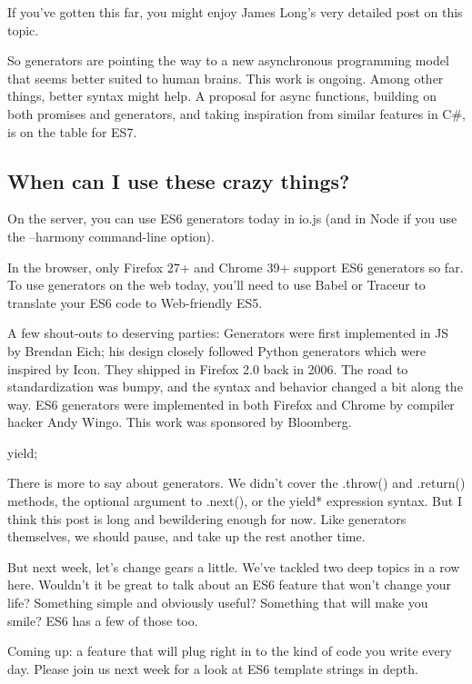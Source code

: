         If you've gotten this far, you might enjoy James Long's very detailed post on this topic.

        So generators are pointing the way to a new asynchronous programming model that seems better suited to human brains. This work is ongoing. Among other things, better syntax might help. A proposal for async functions, building on both promises and generators, and taking inspiration from similar features in C\#, is on the table for ES7.

    \subsection{When can I use these crazy things?}
      \label{subsec:when_can_i_use_these_crazy_things_}
        On the server, you can use ES6 generators today in io.js (and in Node if you use the --harmony command-line option).

        In the browser, only Firefox 27+ and Chrome 39+ support ES6 generators so far. To use generators on the web today, you'll need to use Babel or Traceur to translate your ES6 code to Web-friendly ES5.

        A few shout-outs to deserving parties: Generators were first implemented in JS by Brendan Eich; his design closely followed Python generators which were inspired by Icon. They shipped in Firefox 2.0 back in 2006. The road to standardization was bumpy, and the syntax and behavior changed a bit along the way. ES6 generators were implemented in both Firefox and Chrome by compiler hacker Andy Wingo. This work was sponsored by Bloomberg.

        yield;

        There is more to say about generators. We didn't cover the .throw() and .return() methods, the optional argument to .next(), or the yield* expression syntax. But I think this post is long and bewildering enough for now. Like generators themselves, we should pause, and take up the rest another time.

        But next week, let's change gears a little. We've tackled two deep topics in a row here. Wouldn't it be great to talk about an ES6 feature that won't change your life? Something simple and obviously useful? Something that will make you smile? ES6 has a few of those too.

        Coming up: a feature that will plug right in to the kind of code you write every day. Please join us next week for a look at ES6 template strings in depth.
